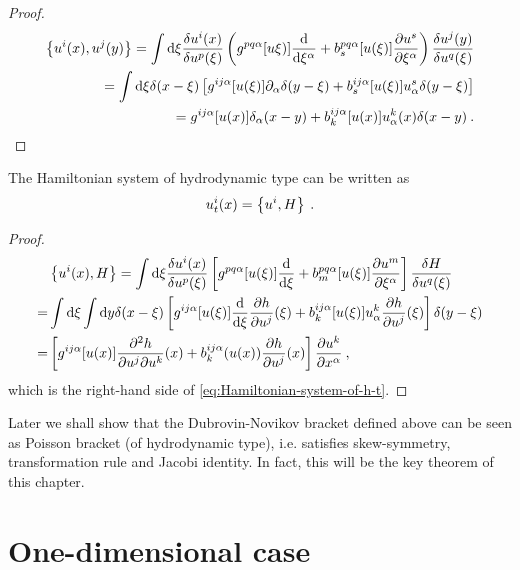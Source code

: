 \begin{proof}
    \begin{align*}
        \left \lbrace u^i(x), u^j(y) \right \rbrace = \int \mathrm{d} \xi \frac{\delta u^i(x)}{\delta u^p(\xi)} \left( g^{pq \alpha}[u\xi)] \frac{\mathrm{d}}{\mathrm{d}\xi^\alpha} + b^{pq \alpha}_s[u(\xi)] \frac{\partial u^s}{\partial \xi^\alpha} \right) \frac{\delta u^j(y)}{\delta u^q(\xi)}
        \\ = \int \mathrm{d} \xi \delta(x-\xi) \left[ g^{ij \alpha}[u(\xi)] \partial_\alpha \delta(y-\xi) + b^{ij \alpha}_s[u(\xi)] u^s_\alpha \delta(y- \xi) \right] 
        \\ = g^{ij \alpha} [u(x)] \delta_\alpha(x-y) + b_k^{ij \alpha} [u(x)] u_\alpha^k(x) \delta(x-y) \:.
    \end{align*}
\end{proof}

\begin{proposition}
    The Hamiltonian system of hydrodynamic type can be written as
    \begin{align}
        u^i_t(x) = \left \lbrace u^i,H \right \rbrace \:.
    \end{align}
\end{proposition}
\begin{proof}
    \begin{align*}
        &\left \lbrace u^i(x),H \right \rbrace 
        = \int \mathrm{d} \xi \frac{\delta u^i(x)}{\delta u^p(\xi)} \left[ g^{pq \alpha}[u(\xi)] \frac{\mathrm{d}}{\mathrm{d}\xi} + b^{pq \alpha}_m [u(\xi)] \frac{\partial u^m}{\partial \xi^\alpha} \right] \frac{\delta H}{\delta u^q(\xi)} 
        \\ =& \int \mathrm{d} \xi \int \mathrm{d} y \delta(x-\xi) \left[  g^{ij \alpha} [u(\xi)] \frac{\mathrm{d}}{\mathrm{d}\xi} \frac{\partial h}{\partial u^j}(\xi)  + b^{ij \alpha}_k [u(\xi)] u^k_\alpha \frac{\partial h}{\partial u^j} (\xi) \right] \delta(y-\xi)
        \\ =& \left[ g^{ij \alpha} [u(x)] \frac{\partial ^2 h}{\partial u^j \partial u^k}(x)  + b^{ij \alpha}_k(u(x)) \frac{\partial h}{\partial u^j}(x) \right] \frac{\partial u^k}{\partial x^\alpha} \:,
    \end{align*}
    which is the right-hand side of \eqref{eq:Hamiltonian-system-of-h-t}.
\end{proof}

Later we shall show that the Dubrovin-Novikov bracket defined above can be seen as Poisson bracket (of hydrodynamic type), i.e. satisfies  skew-symmetry, transformation rule and Jacobi identity. In fact, this will be the key theorem of this chapter.

\section{One-dimensional case}

